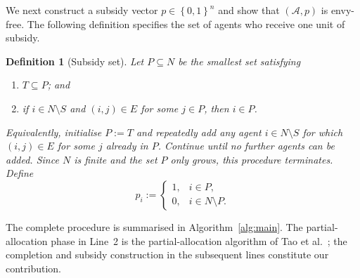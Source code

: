 \documentclass[sigconf,anonymous]{aamas}
\newcommand{\agents}{N}
\newcommand{\alloc}{\mathcal{A}}
\newcommand{\subsidy}{p}
\newcommand{\set}[1]{\left\{#1\right\}}
\theoremstyle{acmplain}
\theoremstyle{acmdefinition}
\newtheorem{definition}[theorem]{Definition}
\theoremstyle{acmplain}
\begin{document}
We next construct a subsidy vector $\subsidy\in\set{0,1}^n$ and show that $(\alloc,\subsidy)$ is envy-free. The following definition specifies the set of agents who receive one unit of subsidy.

\begin{definition}[Subsidy set]
\label{def:m-P}
Let $P\subseteq\agents$ be the smallest set satisfying
\begin{enumerate}
  \item[(P1)] $T\subseteq P$; and
  \item[(P2)] if $i\in\agents\setminus S$ and $(i,j)\in E$ for some
        $j\in P$, then $i\in P$.
\end{enumerate}
Equivalently, initialise $P:=T$ and repeatedly add any agent $i\in\agents\setminus S$ for which $(i,j)\in E$ for some $j$ already in $P$. Continue until no further agents can be added. Since $\agents$ is finite and the set $P$ only grows, this procedure terminates.
Define
\begin{equation}
\label{eq:m-subsidy}
  \subsidy_i :=
  \begin{cases}
    1, & i\in P,\\
    0, & i\in\agents\setminus P.
  \end{cases}
\end{equation}
\end{definition}

The complete procedure is summarised in Algorithm~\ref{alg:main}. The partial-allocation phase in Line~2 is the partial-allocation algorithm of Tao et al.~\cite{tao2025existence}; the completion and subsidy construction in the subsequent lines constitute our contribution.
\end{document}
